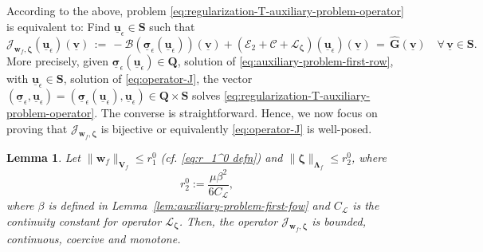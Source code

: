 \documentclass[11pt]{article}
\numberwithin{equation}{section}
\newcommand{\bLambda}{{\boldsymbol\Lambda}}
\newcommand{\bsi}{{\boldsymbol\sigma}}
\newcommand{\bzeta}{{\boldsymbol\zeta}}
\newcommand{\ubsi}{\underline{\bsi}}
\newcommand{\ubu}{\underline{\bu}}
\newcommand{\ubv}{\underline{\bv}}
\newcommand{\bv}{{\mathbf{v}}}
\newcommand{\bw}{{\mathbf{w}}}
\newcommand{\bu}{\mathbf{u}}
\newcommand{\0}{{\mathbf{0}}}
\def\bG{\mathbf{G}}
\def\bV{\mathbf{V}}
\def\bQ{\mathbf{Q}}
\def\bS{\mathbf{S}}
\newcommand{\cB}{\mathcal{B}}
\newcommand{\cC}{\mathcal{C}}
\newcommand{\cE}{\mathcal{E}}
\newcommand{\cJ}{\mathcal{J}}
\newcommand{\cL}{\mathcal{L}}
\def\wh{\widehat}
\newtheorem{lem}[thm]{Lemma}
\numberwithin{equation}{section}
\begin{document}
According to the above, problem \eqref{eq:regularization-T-auxiliary-problem-operator} is equivalent to:
Find $\ubu_\epsilon\in \bS$ such that
\begin{equation}\label{eq:operator-J}
\cJ_{\bw_f,\bzeta}(\ubu_\epsilon)(\ubv) 
\,:=\, -\cB(\ubsi_\epsilon(\ubu_\epsilon))(\ubv) + (\cE_2 + \cC + \cL_{\bzeta})(\ubu_\epsilon)(\ubv) 
\,=\, \wh{\bG}(\ubv) \quad \forall\,\ubv\in \bS.
\end{equation}
More precisely, given $\ubsi_\epsilon(\ubu_\epsilon)\in \bQ$, solution of \eqref{eq:auxiliary-problem-first-row}, with $\ubu_\epsilon\in \bS$, solution of \eqref{eq:operator-J}, the vector $(\ubsi_\epsilon,\ubu_\epsilon) = (\ubsi_\epsilon(\ubu_\epsilon),\ubu_\epsilon)\in \bQ\times \bS$ solves \eqref{eq:regularization-T-auxiliary-problem-operator}.
The converse is straightforward.
Hence, we now focus on proving that $\cJ_{\bw_f,\bzeta}$ is bijective or equivalently \eqref{eq:operator-J} is well-posed.
\begin{lem}\label{lem:J-bijective}
Let $\|\bw_f\|_{\bV_f}\leq r_1^0$ (cf. \eqref{eq:r_1^0 defn}) and $\|\bzeta\|_{\bLambda_f} \leq r_2^0$,  where
\begin{equation}\label{eq:r20-def}
r_2^0 :=\frac{\mu \beta^2}{6C_{\cL}},
\end{equation}
where $\beta$ is defined in Lemma~\ref{lem:auxiliary-problem-first-fow} and $C_{\cL}$ is the continuity constant for operator $\cL_{\bzeta}$. Then, the operator $\cJ_{\bw_f,\bzeta}$ is bounded, continuous, coercive and monotone.
\end{lem}
%
\end{document}
